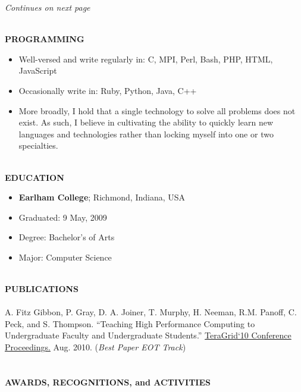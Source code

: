 \documentclass[10pt]{article}
\begin{document}
\vfill
\begin{flushright}
\emph{Continues on next page}
\end{flushright}

\pagebreak

~\\
\textbf{PROGRAMMING}~\\
\vspace{-4mm}
\begin{itemize}
  \addtolength{\itemsep}{-2mm}
	\item \indent Well-versed and write regularly in: C, MPI, Perl, Bash, PHP, HTML, JavaScript
	\item \indent Occasionally write in: Ruby, Python, Java, C++
	\item \indent More broadly, I hold that a single technology to solve all problems does not exist. As such, I believe in cultivating the ability to quickly learn new languages and technologies rather than locking myself into one or two specialties.
\end{itemize}
~\\
\textbf{EDUCATION}~\\
\vspace{-4mm}
\begin{itemize}
  \addtolength{\itemsep}{-2mm}
	\item[] \indent \textbf{Earlham College}; Richmond, Indiana, USA
	\item[] \indent Graduated: 9 May, 2009
	\item[] \indent Degree: Bachelor's of Arts
	\item[] \indent Major: Computer Science
\end{itemize}
~\\
\textbf{PUBLICATIONS}~\\
	~\\
	\indent A. Fitz Gibbon, P. Gray, D. A. Joiner, T. Murphy, H. Neeman, R.M. Panoff, C. Peck, and S. Thompson. ``Teaching High Performance Computing to Undergraduate Faculty and Undergraduate Students.'' \underline{TeraGrid`10 Conference Proceedings.} Aug. 2010. (\emph{Best Paper EOT Track})
~\\
~\\
~\\
\textbf{AWARDS, RECOGNITIONS, and ACTIVITIES}~\\
\vspace{-4mm}
\end{document}
